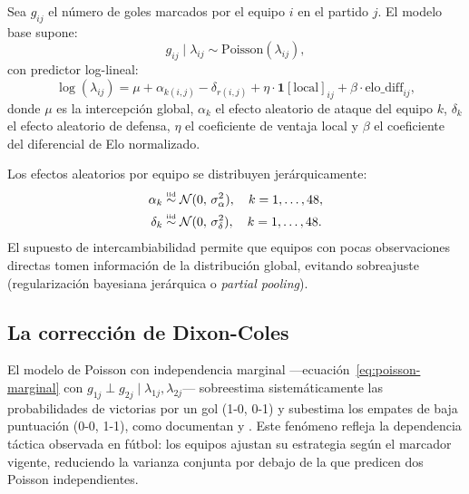 \documentclass[12pt,a4paper]{article}
\newcommand{\iid}{\overset{\text{\tiny iid}}{\sim}}
\begin{document}
Sea $g_{ij}$ el número de goles marcados por el equipo $i$ en el partido $j$.
El modelo base supone:
\begin{equation}
  g_{ij} \mid \lambda_{ij} \sim \text{Poisson}(\lambda_{ij}),
  \label{eq:poisson-marginal}
\end{equation}
con predictor log-lineal:
\begin{equation}
  \log(\lambda_{ij}) = \mu + \alpha_{k(i,j)} - \delta_{r(i,j)}
                        + \eta \cdot \mathbf{1}[\text{local}]_{ij}
                        + \beta \cdot \text{elo\_diff}_{ij},
  \label{eq:log-linear}
\end{equation}
donde $\mu$ es la intercepción global, $\alpha_k$ el efecto aleatorio de ataque
del equipo $k$, $\delta_k$ el efecto aleatorio de defensa, $\eta$ el coeficiente
de ventaja local y $\beta$ el coeficiente del diferencial de Elo normalizado.

Los efectos aleatorios por equipo se distribuyen jerárquicamente:
\begin{align}
  \alpha_k &\iid \mathcal{N}(0,\, \sigma_\alpha^2), \quad k = 1,\ldots,48,
  \label{eq:alpha-hier}\\
  \delta_k &\iid \mathcal{N}(0,\, \sigma_\delta^2), \quad k = 1,\ldots,48.
  \label{eq:delta-hier}
\end{align}
El supuesto de intercambiabilidad permite que equipos con pocas observaciones
directas tomen información de la distribución global, evitando sobreajuste
(regularización bayesiana jerárquica o \textit{partial pooling}).

\subsection{La corrección de Dixon-Coles}
\label{subsec:dc}

El modelo de Poisson con independencia marginal —ecuación~\eqref{eq:poisson-marginal}
con $g_{1j} \perp g_{2j} \mid \lambda_{1j}, \lambda_{2j}$— sobreestima
sistemáticamente las probabilidades de victorias por un gol (1-0, 0-1) y
subestima los empates de baja puntuación (0-0, 1-1), como documentan
\citet{dixon1997modelling} y \citet{karlis2003analysis}.
Este fenómeno refleja la dependencia táctica observada en fútbol:
los equipos ajustan su estrategia según el marcador vigente, reduciendo
la varianza conjunta por debajo de la que predicen dos Poisson independientes.
\end{document}

